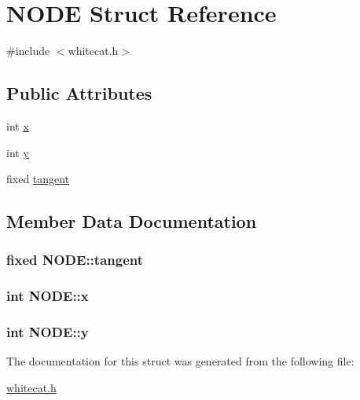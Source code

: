 \hypertarget{struct_n_o_d_e}{\section{N\-O\-D\-E Struct Reference}
\label{struct_n_o_d_e}
}


{\ttfamily \#include $<$whitecat.\-h$>$}

\subsection*{Public Attributes}
\begin{DoxyCompactItemize}
\item 
int \hyperlink{struct_n_o_d_e_ae491648fdefa758c04fd1b39997dfe44}{x}
\item 
int \hyperlink{struct_n_o_d_e_a1c83ccf922c1655a4f4cc90fb7455670}{y}
\item 
fixed \hyperlink{struct_n_o_d_e_ab9675cd84cb7ccf6e2506c7ee233fa2c}{tangent}
\end{DoxyCompactItemize}


\subsection{Member Data Documentation}
\hypertarget{struct_n_o_d_e_ab9675cd84cb7ccf6e2506c7ee233fa2c}{
\subsubsection[{tangent}]{\setlength{\rightskip}{0pt plus 5cm}fixed N\-O\-D\-E\-::tangent}}\label{struct_n_o_d_e_ab9675cd84cb7ccf6e2506c7ee233fa2c}
\hypertarget{struct_n_o_d_e_ae491648fdefa758c04fd1b39997dfe44}{
\subsubsection[{x}]{\setlength{\rightskip}{0pt plus 5cm}int N\-O\-D\-E\-::x}}\label{struct_n_o_d_e_ae491648fdefa758c04fd1b39997dfe44}
\hypertarget{struct_n_o_d_e_a1c83ccf922c1655a4f4cc90fb7455670}{
\subsubsection[{y}]{\setlength{\rightskip}{0pt plus 5cm}int N\-O\-D\-E\-::y}}\label{struct_n_o_d_e_a1c83ccf922c1655a4f4cc90fb7455670}


The documentation for this struct was generated from the following file\-:\begin{DoxyCompactItemize}
\item 
\hyperlink{whitecat_8h}{whitecat.\-h}\end{DoxyCompactItemize}
